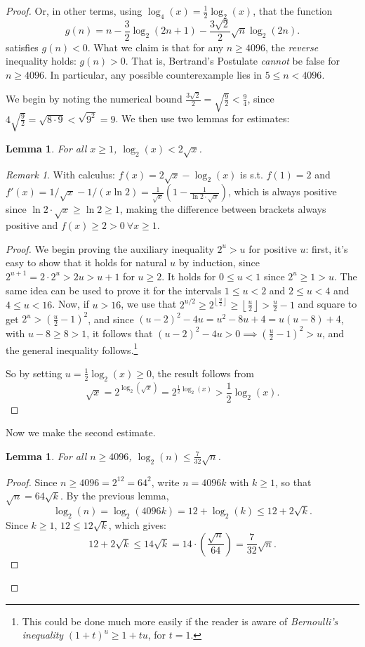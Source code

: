\documentclass[11pt]{article}
\newtheorem{lemma}[theorem]{Lemma}
\theoremstyle{remark}
\newtheorem{remark}[theorem]{Remark}
\newcommand{\floor}[1]{\left\lfloor #1 \right\rfloor}
\newcommand{\vs}{\vspace{10px}}
\begin{document}
\begin{proof}
    Or, in other terms, using $\log_4(x)=\frac12 \log_2(x)$, that the function 
    \[
    g(n) = n - \frac{3}{2}\log_2(2n+1) - \frac{3\sqrt{2}}{2}\sqrt{n}\log_2(2n).
    \]
    satisfies $g(n) < 0$. What we claim is that for any $n\ge 4096$, the \textit{reverse} inequality holds: $g(n)>0$. That is, Bertrand's Postulate \textit{cannot} be false for $n\ge 4096$. In particular, any possible counterexample lies in $5\le n<4096$.\vs

    
    We begin by noting the numerical bound $\frac{3\sqrt{2}}{2} = \sqrt{\frac{9}{2}} < \frac{9}{4}$, since $4\sqrt{\frac92}=\sqrt{8\cdot 9}<\sqrt{9^2}=9$. We then use two lemmas for estimates:
    
    \begin{lemma}
    For all $x \ge 1$, $\log_2(x) < 2\sqrt{x}$.
    \end{lemma}
    \begin{remark}
        With calculus: $f(x)= 2\sqrt{x}-\log_2(x)$ is s.t. $f(1)=2$ and $f'(x)=1/\sqrt{x}-1/(x\ln 2)=\frac{1}{\sqrt{x}}(1-\frac{1}{\ln 2\cdot \sqrt{x}})$, which is always positive since $\ln2\cdot \sqrt{x}\ge \ln 2\ge 1$, making the difference between brackets always positive and $f(x)\ge 2>0\ \forall x\ge 1$.
    \end{remark}
    \begin{proof}
    We begin proving the auxiliary inequality $2^u >u$ for positive $u$: first, it's easy to show that it holds for natural $u$ by induction, since $2^{u+1}= 2\cdot 2^u>2u>u+1$ for $u\ge 2$. It holds for $0\le u<1$ since $2^u\ge 1>u$. The same idea can be used to prove it for the intervals $1\le u<2$ and $2\le u<4$ and $4\le u<16$. Now, if $u>16$, we use that $2^{u/2}\ge 2^{\floor{\frac{u}{2}}}\ge \floor{\frac u2}>\frac{u}{2}-1$ and square to get $2^u> (\frac{u}{2}-1)^2$, and since $(u-2)^2-4u = u^2 - 8u +4 = u(u-8)+4$, with $u-8\ge 8>1$, it follows that $(u-2)^2-4u>0\implies (\frac{u}2-1)^2>u$, and the general inequality follows.\footnote{This could be done much more easily if the reader is aware of \textit{Bernoulli's inequality} $(1+t)^u\ge 1+tu$, for $t = 1$.}
    
    So by setting $u = \frac{1}{2}\log_2(x) \ge 0$, the result follows from
    \[
    \sqrt{x}=2^{\log_2(\sqrt{x})}=2^{\frac{1}{2}\log_2(x)} > \frac{1}{2}\log_2(x).
    \]
    \end{proof}

    Now we make the second estimate.
    \begin{lemma}
    For all $n \ge 4096$, $\log_2(n) \le \frac{7}{32}\sqrt{n}$.
    \end{lemma}
    \begin{proof}
    Since $n \ge 4096 = 2^{12}=64^2$, write $n = 4096k$ with $k \ge 1$, so that $\sqrt{n} = 64\sqrt{k}$. By the previous lemma,
    \[
    \log_2(n) = \log_2(4096k) = 12 + \log_2(k) \le 12 + 2\sqrt{k}.
    \]
    Since $k \ge 1$, $12 \le 12\sqrt{k}$, which gives:
    \[
    12 + 2\sqrt{k} \le 14\sqrt{k} = 14 \cdot \left(\frac{\sqrt{n}}{64}\right) = \frac{7}{32}\sqrt{n}.
    \]
    \end{proof}
    

\end{proof}
\end{document}
